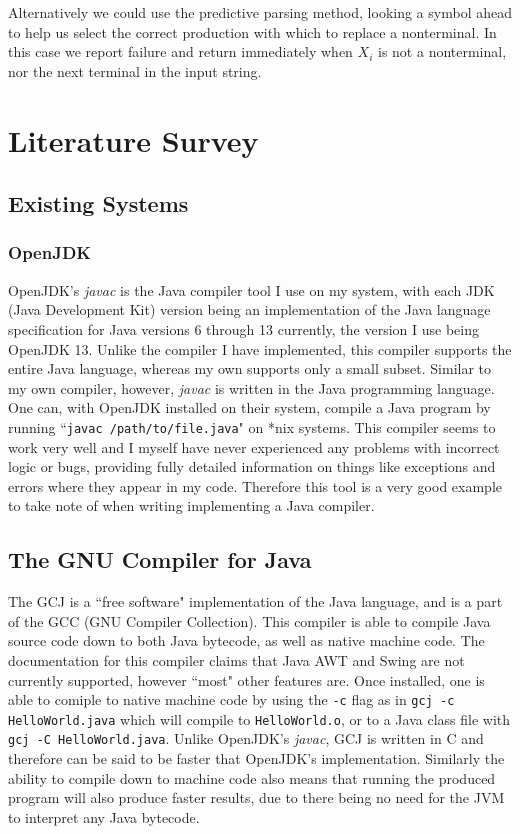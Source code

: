 \documentclass[a4paper, 11pt]{article}
\begin{document}
Alternatively we could use the predictive parsing method, looking a symbol ahead to help us select the correct production with which to replace a nonterminal. In this case we report failure and return immediately when $X_i$ is not a nonterminal, nor the next terminal in the input string.

\newpage\section{Literature Survey}
\subsection{Existing Systems}

\subsubsection{OpenJDK\cite{OpenJDK}}
OpenJDK's \textit{javac} is the Java compiler tool I use on my system, with each JDK (Java Development Kit) version being an implementation of the Java language specification for Java versions 6 through 13 currently, the version I use being OpenJDK 13. Unlike the compiler I have implemented, this compiler supports the entire Java language, whereas my own supports only a small subset. Similar to my own compiler, however, \textit{javac} is written in the Java programming language. One can, with OpenJDK installed on their system, compile a Java program by running ``\texttt{javac /path/to/file.java}" on *nix systems. This compiler seems to work very well and I myself have never experienced any problems with incorrect logic or bugs, providing fully detailed information on things like exceptions and errors where they appear in my code. Therefore this tool is a very good example to take note of when writing implementing a Java compiler.

\subsection{The GNU Compiler for Java\cite{GCJ}}
The GCJ is a ``free software" implementation of the Java language, and is a part of the GCC (GNU Compiler Collection). This compiler is able to compile Java source code down to both Java bytecode, as well as native machine code. The documentation for this compiler claims that Java AWT and Swing are not currently supported, however ``most" other features are. Once installed, one is able to  comiple to native machine code by using the \texttt{-c} flag as in \texttt{gcj -c HelloWorld.java} which will compile to \texttt{HelloWorld.o}, or to a Java class file with \texttt{gcj -C HelloWorld.java}. Unlike OpenJDK's \textit{javac}, GCJ is written in C and therefore can be said to be faster that OpenJDK's implementation. Similarly the ability to compile down to machine code also means that running the produced program will also produce faster results, due to there being no need for the JVM to interpret any Java bytecode.
\end{document}
